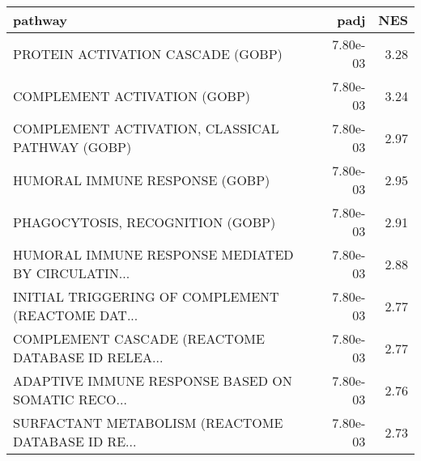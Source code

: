 \begin{tabular}{lrr}
\toprule
                                           pathway &      padj &   NES \\
\midrule
                 PROTEIN ACTIVATION CASCADE (GOBP) &  7.80e-03 &  3.28 \\
                      COMPLEMENT ACTIVATION (GOBP) &  7.80e-03 &  3.24 \\
   COMPLEMENT ACTIVATION, CLASSICAL PATHWAY (GOBP) &  7.80e-03 &  2.97 \\
                    HUMORAL IMMUNE RESPONSE (GOBP) &  7.80e-03 &  2.95 \\
                  PHAGOCYTOSIS, RECOGNITION (GOBP) &  7.80e-03 &  2.91 \\
 HUMORAL IMMUNE RESPONSE MEDIATED BY CIRCULATIN... &  7.80e-03 &  2.88 \\
 INITIAL TRIGGERING OF COMPLEMENT (REACTOME DAT... &  7.80e-03 &  2.77 \\
 COMPLEMENT CASCADE (REACTOME DATABASE ID RELEA... &  7.80e-03 &  2.77 \\
 ADAPTIVE IMMUNE RESPONSE BASED ON SOMATIC RECO... &  7.80e-03 &  2.76 \\
 SURFACTANT METABOLISM (REACTOME DATABASE ID RE... &  7.80e-03 &  2.73 \\
\bottomrule
\end{tabular}
